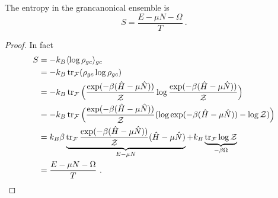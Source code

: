     The entropy in the grancanonical ensemble is 
    \begin{equation*}
        S = \frac{E - \mu N - \Omega}{T} ~.
    \end{equation*}
    \begin{proof}
        In fact 
        \begin{equation*}
        \begin{aligned}
            S & = - k_B \langle\log \rho_{gc}\rangle_{gc} \\ & = - k_B \operatorname{tr}_{\mathcal F} ( \rho_{gc} \log \rho_{gc}) \\ & = - k_B \operatorname{tr}_{\mathcal F} \Big ( \frac{\exp(- \beta (\hat H - \mu \hat N))}{\mathcal Z} \log \frac{\exp(- \beta (\hat H - \mu \hat N))}{\mathcal Z} \Big) \\ & = - k_B \operatorname{tr}_{\mathcal F} \Big ( \frac{\exp(- \beta (\hat H - \mu \hat N))}{\mathcal Z} (\log \exp(- \beta (\hat H - \mu \hat N)) - \log \mathcal Z) \Big) \\ & = k_B \beta \underbrace{\operatorname{tr}_{\mathcal F} \frac{\exp(- \beta (\hat H - \mu \hat N))}{\mathcal Z} (\hat H - \mu \hat N)}_{E - \mu N} + k_B \underbrace{\operatorname{tr}_{\mathcal F} \log \mathcal Z }_{- \beta \Omega} \\ & = \frac{E - \mu N - \Omega}{T} ~.
        \end{aligned}
        \end{equation*}
    \end{proof}